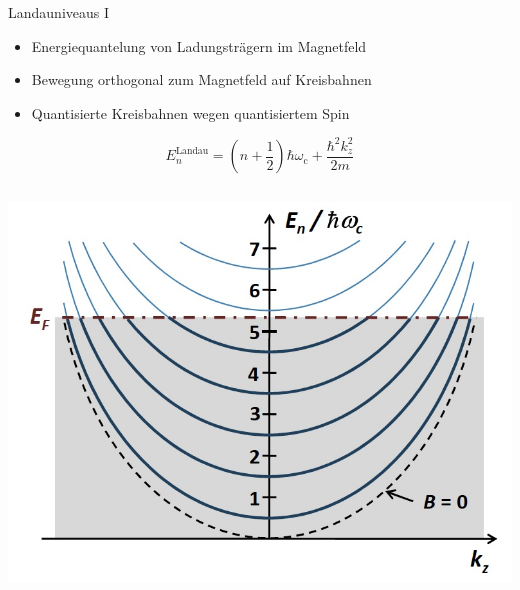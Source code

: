 \documentclass[../defence.tex]{subfiles}
\begin{document}
  \begin{frame}{Landauniveaus I}
    \pause
    \begin{itemize}
      \item Energiequantelung von Ladungsträgern im Magnetfeld
      \pause
      \item Bewegung orthogonal zum Magnetfeld auf Kreisbahnen
      \pause
      \item Quantisierte Kreisbahnen wegen quantisiertem Spin
    \end{itemize}
    \pause
    \begin{equation*}
        E_n^\mathrm{Landau}=\left( n+\frac{1}{2}\right)\hbar\omega_\mathrm{c}+\frac{\hbar^2k_z^2}{2m}
    \end{equation*}
    \pause
    \begin{columns}[onlytextwidth, T]
        \includegraphics[width=\linewidth]{images/landau_parabeln.png}
        \cite{gross}
    \end{columns}
  \end{frame}
\end{document}
